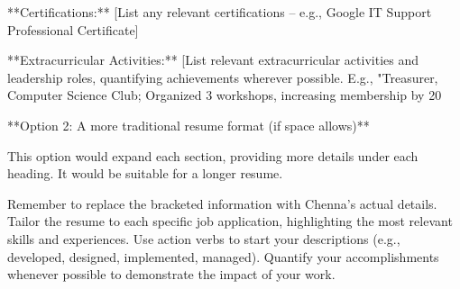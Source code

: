 \documentclass[a4paper, 12pt]{article}
\begin{document}
**Certifications:** [List any relevant certifications – e.g.,  Google IT Support Professional Certificate]

**Extracurricular Activities:** [List relevant extracurricular activities and leadership roles,  quantifying achievements wherever possible. E.g., "Treasurer, Computer Science Club; Organized 3 workshops, increasing membership by 20%



**Option 2:  A more traditional resume format (if space allows)**

This option would expand each section, providing more details under each heading.  It would be suitable for a longer resume.


Remember to replace the bracketed information with Chenna's actual details.  Tailor the resume to each specific job application, highlighting the most relevant skills and experiences.  Use action verbs to start your descriptions (e.g., developed, designed, implemented, managed).  Quantify your accomplishments whenever possible to demonstrate the impact of your work.
 
   
    
\end{document}
